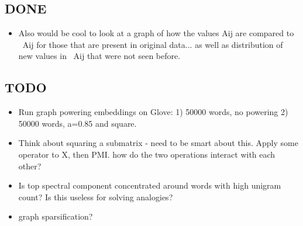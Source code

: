\documentclass[12pt]{article}
\begin{document}
\subsection{DONE}
\begin{itemize}
\item Also would be cool to look at a graph of how the values Aij are compared to ~Aij for those that are present in original data... as well as distribution of new values in ~Aij that were not seen before. 
\end{itemize}

\subsection{TODO}
\begin{itemize}
\item Run graph powering embeddings on Glove: 1) 50000 words, no powering 2) 50000 words, a=0.85 and square.
\item Think about squaring a submatrix - need to be smart about this. Apply some operator to X, then PMI. how do the two operations interact with each other? 
\item Is top spectral component concentrated around words with high unigram count? Is this useless for solving analogies?
\item graph sparsification?
\end{itemize}
\end{document}
